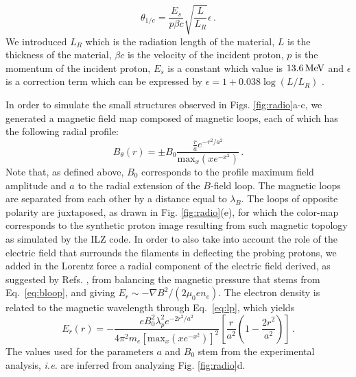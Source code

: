 \documentclass[aps,twocolumn,showpacs,superscriptaddress]{revtex4}
\begin{document}
\begin{equation}
\theta_{1/e}  = \frac{E_s}{p\beta c} \sqrt{\frac{L}{L_R}} \epsilon  \, .
\end{equation}
We introduced $L_R$ which is the radiation length of the material, $L$ is the thickness of the material, $\beta c$ is the velocity of the incident proton, $p$ is the momentum of the incident proton, $E_s$ is a constant which value is $13.6\,\rm MeV$ and  $\epsilon$ is a correction term which can be expressed by $\epsilon  = 1 + 0.038 \log\left(L/L_R\right)$ \cite{EPJ_Groom_2000}. 

In order to simulate the small structures observed in Figs. \ref{fig:radio}a-c, we generated a magnetic field map composed of magnetic loops, each of which has the following radial profile:
\begin{equation}\label{eq:bloop}
B_\theta(r)  = \pm B_0  \frac{ \frac{r}{a} e^{-r^2/a^2} }{\mathrm{max}_x(xe^{-x^2})} \, .
\end{equation} %
Note that, as defined above, $B_0$ corresponds to the profile maximum field amplitude and $a$ to the radial extension of the $B$-field loop.
The magnetic loops are separated from each other by a distance equal to $\lambda_B$.
The loops of opposite polarity are juxtaposed, as drawn in Fig. \ref{fig:radio}(e), for which the color-map corresponds to the synthetic proton image resulting from such magnetic topology as simulated by the ILZ code.
In order to also take into account the role of the electric field that surrounds the filaments in deflecting the probing protons, we added in the Lorentz force a radial component of the electric field  derived, as suggested by Refs. \cite{POP_Dieckmann_2009, POP_Bret_Gremillet_2010}, from balancing the magnetic pressure that stems from Eq.~\eqref{eq:bloop}, and giving $E_r \sim -\nabla B^2 /(2\mu_0e n_e)$. The  electron density is related to the magnetic wavelength through Eq.~\eqref{eq:lp}, which yields
\begin{equation}\label{eq:eloop}
E_r(r) = -\frac{  eB_0^2\lambda_p^2   e^{-2r^2/a^2}}{4\pi^2 m_e [\mathrm{max}_x(xe^{-x^2})]^2} \left[ \frac{r}{a^2}\left( 1-\frac{2r^2}{a^2}\right)  \right]  \, .
\end{equation} 
The values used for the parameters $a$ and $B_0$ stem from the experimental analysis, \emph{i.e.} are inferred from analyzing Fig. \ref{fig:radio}d. 
\end{document}

